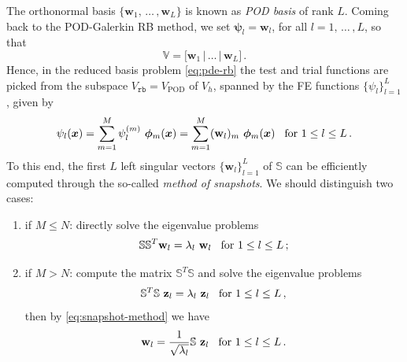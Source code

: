 \documentclass[12pt, a4paper, twoside, openright]{report}
\numberwithin{equation}{chapter}
\theoremstyle{theorem}
\theoremstyle{definition}
\theoremstyle{remark}
\theoremstyle{proposition}
\numberwithin{figure}{chapter}
\newcommand{\bg}[1]{\boldsymbol{#1}}
\begin{document}
		The orthonormal basis $\big\lbrace \mathbf{w}_1, \, \ldots \, , \mathbf{w}_L \big\rbrace$ is known as \emph{POD basis} of rank $L$. Coming back to the POD-Galerkin RB method, we set $\bg{\psi}_l = \mathbf{w}_l$, for all $l = 1, \, \ldots \, , L$, so that
		\begin{equation}
			\mathbb{V} = \big[ \mathbf{w}_1 \, \big| \, \ldots \, \big| \, \mathbf{w}_L \big] \, .
		\end{equation}
		Hence, in the reduced basis problem \eqref{eq:pde-rb} the test and trial functions are picked from the subspace $V_{\texttt{rb}} = V_{\text{POD}}$ of $V_h$, spanned by the FE functions $\big\lbrace \psi_l \big\rbrace_{l = 1}^L$, given by
		\begin{equation}
			\psi_l(\bg{x}) = \sum_{m = 1}^M \psi_l^{(m)} ~ \bg{\phi}_m(\bg{x}) = \sum_{m = 1}^M (\mathbf{w}_l)_m ~ \bg{\phi}_m(\bg{x}) \hspace*{0.3cm} \text{for $1 \leq l \leq L$} \, .
		\end{equation}
		To this end, the first $L$ left singular vectors $\big\lbrace \mathbf{w}_l \big\rbrace_{l = 1}^L$ of $\mathbb{S}$ can be efficiently computed through the so-called \emph{method of snapshots}. We should distinguish two cases:
		\begin{enumerate}[label=(\alph*)]
			\item if $M \leq N$: directly solve the eigenvalue problems
			\begin{equation*}
				\mathbb{S} \mathbb{S}^T \mathbf{w}_l = \lambda_l ~ \mathbf{w}_l \hspace*{0.3cm} \text{for $1 \leq l \leq L$} \, ;
			\end{equation*}
			\item if $M > N$: compute the matrix $\mathbb{S}^T \mathbb{S}$ and solve the eigenvalue problems
			\begin{equation*}
				\mathbb{S}^T \mathbb{S} ~ \mathbf{z}_l = \lambda_l ~ \mathbf{z}_l \hspace*{0.3cm} \text{for $1 \leq l \leq L$} \, ,
			\end{equation*} 
			then by \eqref{eq:snapshot-method} we have
			\begin{equation*}
				\mathbf{w}_l = \dfrac{1}{\sqrt{\lambda_l}} \mathbb{S} ~ \mathbf{z}_l \hspace*{0.3cm} \text{for $1 \leq l \leq L$} \, .
			\end{equation*}
		\end{enumerate}
		
\end{document}

